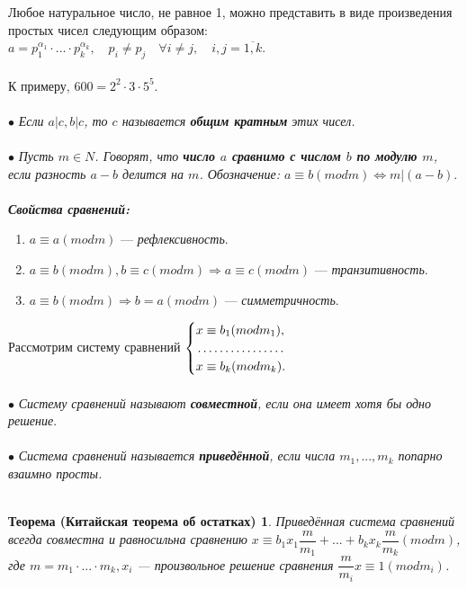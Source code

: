 \documentclass[a4paper, 12pt]{report}
\begin{document}
	Любое натуральное число, не равное 1, можно представить в виде произведения простых чисел следующим образом: $a = p_1^{\alpha_1} \cdot ... \cdot p_k^{\alpha_k},\quad p_i \ne p_j\quad \forall i \ne j,\quad i, j = \overline{1, k}$.\\\\
	К примеру, $600 = 2^2 \cdot 3 \cdot 5^5$.\\\\
	$\bullet$ \textit{Если $a|c, b|c$, то $c$ называется \textbf{общим кратным} этих чисел.}\\\\
	$\bullet$ \textit{Пусть $m \in N$. Говорят, что \textbf{число $a$ сравнимо с числом $b$ по модулю $m$}, если разность $a - b$ делится на $m$. Обозначение: $a \equiv b(mod m) \Leftrightarrow m | (a - b)$}.\\\\
	\textbf{\textit{Свойства сравнений:}}
	\begin{enumerate}
		\item $a \equiv a (mod m)$ --- \textit{рефлексивность}.
		
		\item $a \equiv b(mod m), b \equiv c (mod m) \Rightarrow a \equiv c(mod m)$ --- \textit{транзитивность}.
		
		\item $a \equiv b(mod m) \Rightarrow b = a(mod m)$ --- \textit{симметричность}.
	\end{enumerate}
	Рассмотрим систему сравнений 
	$\begin{cases}
		x \equiv b_1 (mod m_1), \\
		\dotfill \\
		x \equiv b_k (mod m_k).
	\end{cases}$\\\\
	$\bullet$ \textit{Систему сравнений называют \textbf{совместной}, если она имеет хотя бы одно решение}.\\\\
	$\bullet$ \textit{Система сравнений называется \textbf{приведённой}, если числа $m_1, ..., m_k$ попарно взаимно просты.}\\\\
	\newtheorem*{th45_1}{Теорема (Китайская теорема об остатках)}\begin{th45_1}Приведённая система сравнений всегда совместна и равносильна сравнению $x \equiv b_1x_1\dfrac{m}{m_1} + ... + b_kx_k\dfrac{m}{m_k} (mod m)$, где $m = m_1 \cdot ... \cdot m_k, x_i$ --- произвольное решение сравнения $\dfrac{m}{m_i}x \equiv 1(mod m_i)$.
	\end{th45_1}
\end{document}
